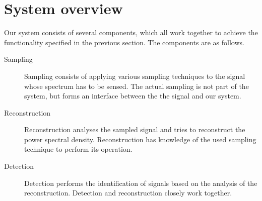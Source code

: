 \documentclass[a4paper, openany, oneside]{memoir}
\begin{document}










\section{System overview}
\label{sec:theory-system-overview}
Our system consists of several components, which all work together to achieve the functionality specified in the previous section. The components are as follows.

\begin{description}
    \item[Sampling] Sampling consists of applying various sampling techniques to the signal whose spectrum has to be sensed. The actual sampling is not part of the system, but forms an interface between the the signal and our system.
    \item[Reconstruction] Reconstruction analyses the sampled signal and tries to reconstruct the power spectral density. Reconstruction has knowledge of the used sampling technique to perform its operation.
    \item[Detection] Detection performs the identification of signals based on the analysis of the reconstruction. Detection and reconstruction closely work together.
\end{description}
\end{document}
